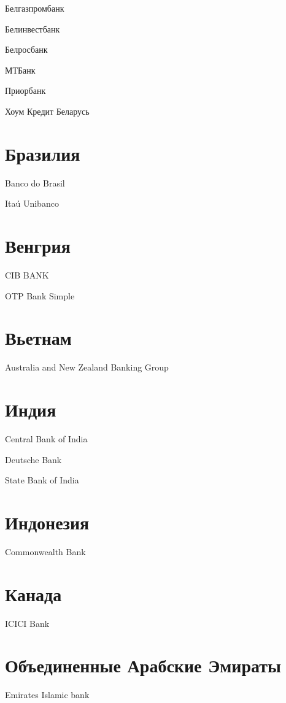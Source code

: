 \documentclass[a4paper,10pt,russian]{sphinxmanual}
\begin{document}
\sphinxAtStartPar
Белгазпромбанк

\sphinxAtStartPar
Белинвестбанк

\sphinxAtStartPar
Белросбанк

\sphinxAtStartPar
МТБанк

\sphinxAtStartPar
Приорбанк

\sphinxAtStartPar
Хоум Кредит Беларусь


\section{Бразилия}
\label{\detokenize{banks:id3}}
\sphinxAtStartPar
Banco do Brasil

\sphinxAtStartPar
Itaú Unibanco


\section{Венгрия}
\label{\detokenize{banks:id4}}
\sphinxAtStartPar
CIB BANK

\sphinxAtStartPar
OTP Bank \sphinxhyphen{} Simple


\section{Вьетнам}
\label{\detokenize{banks:id5}}
\sphinxAtStartPar
Australia and New Zealand Banking Group


\section{Индия}
\label{\detokenize{banks:id6}}
\sphinxAtStartPar
Central Bank of India

\sphinxAtStartPar
Deutsche Bank

\sphinxAtStartPar
State Bank of India


\section{Индонезия}
\label{\detokenize{banks:id7}}
\sphinxAtStartPar
Commonwealth Bank


\section{Канада}
\label{\detokenize{banks:id8}}
\sphinxAtStartPar
ICICI Bank


\section{Объединенные Арабские Эмираты}
\label{\detokenize{banks:id9}}
\sphinxAtStartPar
Emirates Islamic bank
\end{document}
